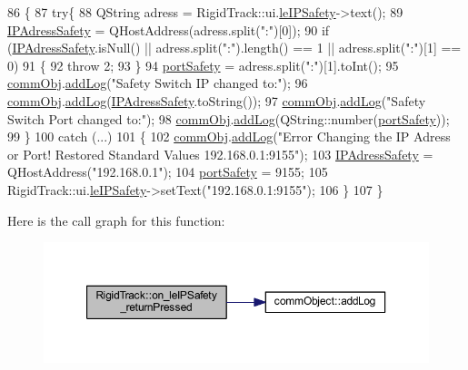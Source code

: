 \begin{DoxyCode}
86 \{
87     \textcolor{keywordflow}{try}\{
88     QString adress = RigidTrack::ui.\hyperlink{class_ui___rigid_track_class_af722611603b357175b3ce505bdf468b1}{leIPSafety}->text();
89     \hyperlink{main_8cpp_afefb1102a8a4a71b55d6f24f46404cc5}{IPAdressSafety} = QHostAddress(adress.split(\textcolor{stringliteral}{":"})[0]);
90     \textcolor{keywordflow}{if} (\hyperlink{main_8cpp_afefb1102a8a4a71b55d6f24f46404cc5}{IPAdressSafety}.isNull() || adress.split(\textcolor{stringliteral}{":"}).length() == 1 || adress.split(\textcolor{stringliteral}{":"})[1] ==
       0)
91     \{
92         \textcolor{keywordflow}{throw} 2;
93     \}
94     \hyperlink{main_8cpp_a137bc8cc9d53ad9b176c988a99bc7142}{portSafety} = adress.split(\textcolor{stringliteral}{":"})[1].toInt();
95     \hyperlink{main_8cpp_af29e7fc07ae0979d5fb61b473241d33d}{commObj}.\hyperlink{classcomm_object_aec354c7099b3039083cc4224e071e022}{addLog}(\textcolor{stringliteral}{"Safety Switch IP changed to:"});
96     \hyperlink{main_8cpp_af29e7fc07ae0979d5fb61b473241d33d}{commObj}.\hyperlink{classcomm_object_aec354c7099b3039083cc4224e071e022}{addLog}(\hyperlink{main_8cpp_afefb1102a8a4a71b55d6f24f46404cc5}{IPAdressSafety}.toString());
97     \hyperlink{main_8cpp_af29e7fc07ae0979d5fb61b473241d33d}{commObj}.\hyperlink{classcomm_object_aec354c7099b3039083cc4224e071e022}{addLog}(\textcolor{stringliteral}{"Safety Switch Port changed to:"});
98     \hyperlink{main_8cpp_af29e7fc07ae0979d5fb61b473241d33d}{commObj}.\hyperlink{classcomm_object_aec354c7099b3039083cc4224e071e022}{addLog}(QString::number(\hyperlink{main_8cpp_a137bc8cc9d53ad9b176c988a99bc7142}{portSafety}));
99     \}
100     \textcolor{keywordflow}{catch} (...)
101     \{
102         \hyperlink{main_8cpp_af29e7fc07ae0979d5fb61b473241d33d}{commObj}.\hyperlink{classcomm_object_aec354c7099b3039083cc4224e071e022}{addLog}(\textcolor{stringliteral}{"Error Changing the IP Adress or Port! Restored Standard Values
       192.168.0.1:9155"});
103         \hyperlink{main_8cpp_afefb1102a8a4a71b55d6f24f46404cc5}{IPAdressSafety} = QHostAddress(\textcolor{stringliteral}{"192.168.0.1"});
104         \hyperlink{main_8cpp_a137bc8cc9d53ad9b176c988a99bc7142}{portSafety} = 9155;
105         RigidTrack::ui.\hyperlink{class_ui___rigid_track_class_af722611603b357175b3ce505bdf468b1}{leIPSafety}->setText(\textcolor{stringliteral}{"192.168.0.1:9155"});
106     \}
107     \}
\end{DoxyCode}
Here is the call graph for this function\+:\nopagebreak
\begin{figure}[H]
\begin{center}
\leavevmode
\includegraphics[width=350pt]{class_rigid_track_aa527ab3a2ddc7b31bf1063260efc9755_cgraph}
\end{center}
\end{figure}
